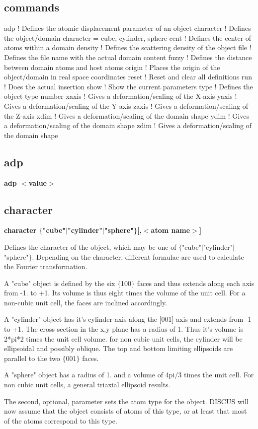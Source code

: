 \subsection*{commands}
\begin{MacVerbatim}
adp        ! Defines the atomic displacement parameter of an object
character  ! Defines the object/domain character = cube, cylinder, sphere
cent       ! Defines the center of atoms within a domain
density    ! Defines the scattering density of the object
file       ! Defines the file name with the actual domain content
fuzzy      ! Defines the distance between domain atoms and host atoms
origin     ! Places the origin of the object/domain in real space coordinates
reset   ! Reset and clear all definitions
run        ! Does the actual insertion
show       ! Show the current parameters
type       ! Defines the object type number
xaxis      ! Gives a deformation/scaling of the X-axis
yaxis      ! Gives a deformation/scaling of the Y-axis
zaxis      ! Gives a deformation/scaling of the Z-axis
xdim       ! Gives a deformation/scaling of the domain shape
ydim       ! Gives a deformation/scaling of the domain shape
zdim       ! Gives a deformation/scaling of the domain shape
\end{MacVerbatim}
\subsection*{adp}
{\bf adp $ <$value$> $ \par }
\subsection*{character}
{\bf character $ \{$"cube"$| $"cylinder"$| $"sphere"$\} $[,$ <$atom name$> $] \par }
\par
\vspace{3pt}
Defines the character of the object, which may be one of 
$ \{$"cube"$| $"cylinder"$| $"sphere"$\} $. Depending on the character, 
different formulae are used to calculate the Fourier transformation. 
\par
A "cube" object is defined by the six $ \{$100$\} $ faces and thus extends 
along each axis from -1. to +1. Its volume is thus eight times 
the volume of the unit cell. For a non-cubic unit cell, the 
faces are inclined accordingly. 
\par
A "cylinder" object has it's cylinder axis along the [001] axis and 
extends from -1 to +1. The cross section in the x,y plane has a 
radius of 1. Thus it's volume is 2*pi*2 times the unit cell volume. 
for non cubic unit cells, the cylinder will be ellipsoidal and 
possibly oblique. The top and bottom limiting ellipsoids are 
parallel to the two $ \{$001$\} $ faces. 
\par
A "sphere" object has a radius of 1. and a volume of 4pi/3 times 
the unit cell. For non cubic unit cells, a general triaxial 
ellipsoid results. 
\par
The second, optional, parameter sets the atom type for the object. 
DISCUS will now assume that the object consists of atoms of this 
type, or at least that most of the atoms correspond to this type. 
